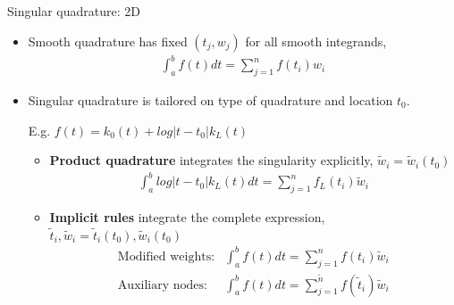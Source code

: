 \documentclass[t]{beamer}
\newcommand{\hg}{\vspace{0.5ex}}
\begin{document}
\begin{noframe}{Singular quadrature: 2D}
  \begin{itemize}
  \item Smooth quadrature has fixed  $(t_j, w_j)$ for all
    smooth integrands,
    \begin{align}
      \int_a^b f(t) dt = \sum_{j=1}^n f(t_i) w_i
    \end{align}
    \pause
  \item Singular quadrature is tailored on type of quadrature and
    location $t_0$.

    \hg
    E.g. $f(t) = k_0(t) + log|t-t_0| k_L(t)$
    \pause
    \begin{itemize}
    \item \textbf{Product quadrature} integrates the singularity explicitly, $\tilde w_i = \tilde w_i(t_0)$
      \begin{align}
        \int_a^b log|t-t_0| k_L(t) dt = \sum_{j=1}^{n} f_L(t_i) \tilde w_i
      \end{align}
      \pause
    \item \textbf{Implicit rules} integrate the complete expression, $\tilde t_i, \tilde w_i = \tilde t_i(t_0), \tilde w_i(t_0)$      
      \begin{align}
        \text{Modified weights:} &       \int_a^b f(t) dt = \sum_{j=1}^n f(t_i) \tilde w_i \\
        \text{Auxiliary nodes:} &       \int_a^b f(t) dt = \sum_{j=1}^{\tilde{n}} f(\tilde t_i) \tilde w_i \\
      \end{align}
    \end{itemize}

  \end{itemize}
  
\end{noframe}
\end{document}
